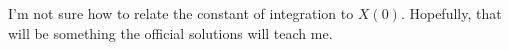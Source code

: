 \begin{homeworkProblem}
   I'm not sure how to relate the constant of integration to $ X(0) $.
   Hopefully, that will be something the official solutions will teach me.
\end{homeworkProblem}
